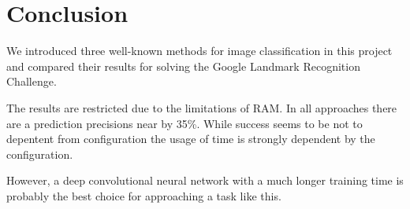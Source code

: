 \chapter{Conclusion}

We introduced three well-known methods for image classification in this project and compared their results for solving the Google Landmark Recognition Challenge.

The results are restricted due to the limitations of RAM. In all approaches there are a prediction precisions near by 35\%. While success seems to be not to depentent from configuration the usage of time is strongly dependent by the configuration.

However, a deep convolutional neural network with a much longer training time is probably the best choice for approaching a task like this.